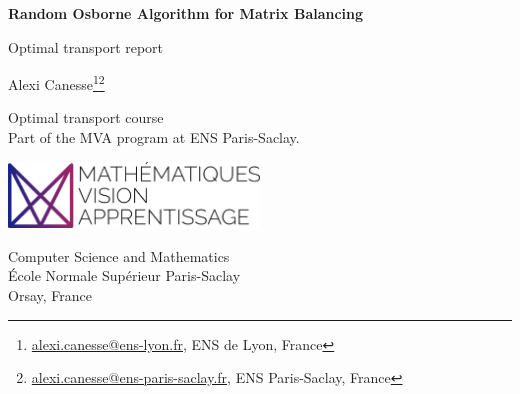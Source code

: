 \renewcommand{\today}{\number\day\textsuperscript{\scriptsize\text{th}} \DTMenglishmonthname{\month} \number\year}


\makeatletter
\newcommand\setxveclength[5]{%
    \pgfpointdiff{#2}{#3}
    \edef#1{\the\pgf@x}
}
\makeatother

\sloppy                  

\pgfplotsset{compat=1.16}








\begin{titlepage}
    \begin{center}
        \vspace*{1cm}
            
        \Huge
        \textbf{Random Osborne Algorithm for Matrix Balancing}
            
        \vspace{0.5cm}
        \LARGE
        Optimal transport report
            
        \vspace{2.5cm}
            
        \huge {\sc Alexi Canesse\footnote{\href{mailto:alexi.canesse@ens-lyon.fr}{alexi.canesse@ens-lyon.fr}, ENS de Lyon, France}\footnote{\href{mailto:alexi.canesse@ens-paris-saclay.fr}{alexi.canesse@ens-paris-saclay.fr}, ENS Paris-Saclay, France}}\\\Large
            
        \vfill

        Optimal transport course\\
        Part of the MVA program at ENS Paris-Saclay.
            
        \vspace{2cm}
        \includegraphics[width=0.5\textwidth]{"./figures/logo.pdf"}
        \vspace{2cm}

        \Large
        Computer Science and Mathematics\\
        École Normale Supérieur Paris-Saclay\\
        Orsay, France\\
        \today
            
    \end{center}
\end{titlepage}





